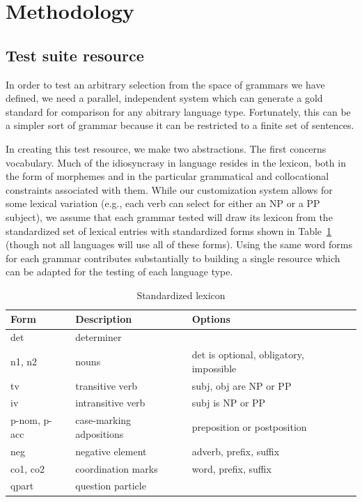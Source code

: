 \documentclass[11pt]{article}
\begin{document}
\section{Methodology}

\subsection{Test suite resource}

In order to test an arbitrary selection from the space of grammars we have
defined, we need a parallel, independent system which can generate a gold
standard for comparison for any abitrary language type.  Fortunately,
this can be a simpler sort of grammar because it can be restricted to a
finite set of sentences.

In creating this test resource, we make two abstractions. The first
concerns vocabulary.  Much of the idiosyncrasy in language resides in
the lexicon, both in the form of morphemes and in the particular
grammatical and collocational constraints associated with them.  While
our customization system allows for some lexical variation (e.g., each
verb can select for either an NP or a PP subject), we assume that
each grammar tested will draw its lexicon from the 
standardized set of lexical entries with standardized forms shown in
Table~\ref{tab1} (though
not all languages will use all of these forms).
Using the same word forms for each grammar contributes substantially
to building a single resource which can be adapted for the testing
of each language type.


\begin{table}[ht]
\begin{center}
\begin{tabular}{|l|l|l|}
\hline
Form & Description & Options \\ \hline \hline
det & determiner & \\ \hline
n1, n2 & nouns & det is optional, obligatory, impossible\\
tv & transitive verb & subj, obj are NP or PP\\
iv & intransitive verb & subj is NP or PP\\
p-nom, p-acc & case-marking adpositions & preposition or postposition\\
neg & negative element & adverb, prefix, suffix\\
co1, co2 & coordination marks & word, prefix, suffix\\
qpart & question particle & \\
\hline
\end{tabular}
\end{center}
\caption{Standardized lexicon}
\label{tab1}
\end{table}
\end{document}
